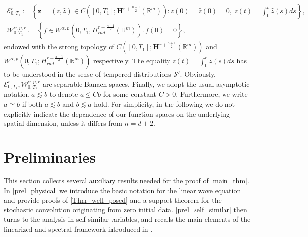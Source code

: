 \documentclass[12pt,reqno]{amsart}
\theoremstyle{plain}
\theoremstyle{remark}
\theoremstyle{plain}
\theoremstyle{definition}
\numberwithin{equation}{section}
\numberwithin{equation}{section}
\def\R{{\mathbb R}}
\begin{document}
    \begin{gather*}
		\mathcal{E}^r_{0,T_1}:=\left\{\mathbf{z}=(z,\hat z)\in C([0,T_1];\mathbf{H}^{r+\frac{n+1}{2}}(\R^m)): z(0)=\hat{z}(0)=0,\ z(t)=\int_0^t \hat{z}(s)ds \right\},\\
		\mathcal{W}^{\alpha,p,r}_{0,T_1}:=\left\{f\in W^{\alpha,p}(0,T_1;H^{r+\frac{n+1}{2}}_{rad}(\R^m)): f(0)=0\right \},
	\end{gather*} endowed with the strong topology of $C([0,T_1];\mathbf{H}^{r+\frac{n+1}{2}}(\R^m))$ and $W^{\alpha,p}(0,T_1;H^{r+\frac{n+1}{2}}_{rad}(\R^m))$ respectively. The equality $z(t)=\int_0^t \hat{z}(s)ds$ has to be understood in the sense of tempered distributions $\mathscr{S}'$. Obviously, $\mathcal{E}_{0,T_1}^r, \mathcal{W}^{\alpha,p,r}_{0,T_1} $ are separable Banach spaces. Finally, we adopt the usual asymptotic notation $a \lesssim b$ to denote $a \leq Cb$ for some constant $C>0$. Furthermore, we write $a \simeq b$ if both $a \lesssim b$ and $b \lesssim a$ hold.
	For simplicity, in the following we do not explicitly indicate the dependence of our function spaces on the underlying spatial dimension, unless it differs from $n=d+2$.
    
\section{Preliminaries}	\label{sec:Stoch_well-posednes}
\noindent This section collects several auxiliary results needed for the proof of \autoref{main_thm}. In \autoref{prel_physical} we introduce the basic notation for the linear wave equation and provide proofs of \autoref{Thm_well_posed} and a support theorem for the stochastic convolution originating from zero initial data. \autoref{prel_self_similar} then turns to the analysis in self-similar variables, and recalls the main elements of the linearized and spectral framework introduced in \cite{glogic2025globally}.
	
\end{document}
